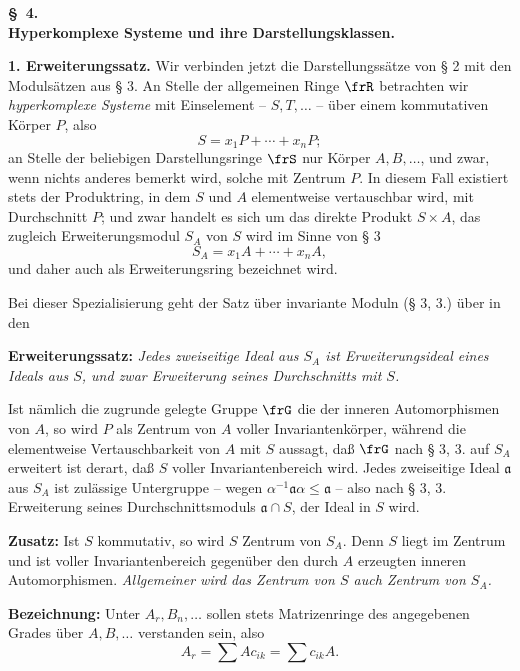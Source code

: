 \begin{center}
\textbf{\S\ 4.}\\[0.5em]
\textbf{Hyperkomplexe Systeme und ihre Darstellungsklassen.}
\end{center}

\noindent\textbf{1. Erweiterungssatz.} Wir verbinden jetzt die Darstellungssätze von § 2 mit den Modulsätzen aus § 3. An Stelle der allgemeinen Ringe \(\frR\) betrachten wir \emph{hyperkomplexe Systeme} mit Einselement -- \(S,T,\ldots\) -- über einem kommutativen Körper \(P\), also
\[
        S=x_1P+\cdots+x_nP;
\]
an Stelle der beliebigen Darstellungsringe \(\frS\) nur Körper \(A,B,\ldots\), und zwar, wenn nichts anderes bemerkt wird, solche mit Zentrum \(P\). In diesem Fall existiert stets der Produktring, in dem \(S\) und \(A\) elementweise vertauschbar wird, mit Durchschnitt \(P\); und zwar handelt es sich um das direkte Produkt \(S\times A\), das zugleich Erweiterungsmodul \(S_A\) von \(S\) wird im Sinne von § 3
\[
        S_A=x_1A+\cdots+x_nA,
\]
und daher auch als Erweiterungsring bezeichnet wird.

Bei dieser Spezialisierung geht der Satz über invariante Moduln (§ 3, 3.) über in den

\noindent\textbf{Erweiterungssatz:} \emph{Jedes zweiseitige Ideal aus \(S_A\) ist Erweiterungsideal eines Ideals aus \(S\), und zwar Erweiterung seines Durchschnitts mit \(S\).}

Ist nämlich die zugrunde gelegte Gruppe \(\frG\) die der inneren Automorphismen von \(A\), so wird \(P\) als Zentrum von \(A\) voller Invariantenkörper, während die elementweise Vertauschbarkeit von \(A\) mit \(S\) aussagt, daß \(\frG\) nach § 3, 3. auf \(S_A\) erweitert ist derart, daß \(S\) voller Invariantenbereich wird. Jedes zweiseitige Ideal \(\mathfrak a\) aus \(S_A\) ist zulässige Untergruppe -- wegen \(\alpha^{-1}\mathfrak a\alpha\leq\mathfrak a\) -- also nach § 3, 3. Erweiterung seines Durchschnittsmoduls \(\mathfrak a\cap S\), der Ideal in \(S\) wird.

\noindent\textbf{Zusatz:} Ist \(S\) kommutativ, so wird \(S\) Zentrum von \(S_A\). Denn \(S\) liegt im Zentrum und ist voller Invariantenbereich gegenüber den durch \(A\) erzeugten inneren Automorphismen. \emph{Allgemeiner wird das Zentrum von \(S\) auch Zentrum von \(S_A\).}

\noindent\textbf{Bezeichnung:} Unter \(A_r,B_n,\ldots\) sollen stets Matrizenringe des angegebenen Grades über \(A,B,\ldots\) verstanden sein, also
\[
        A_r=\sum A c_{ik}=\sum c_{ik}A.
\]

